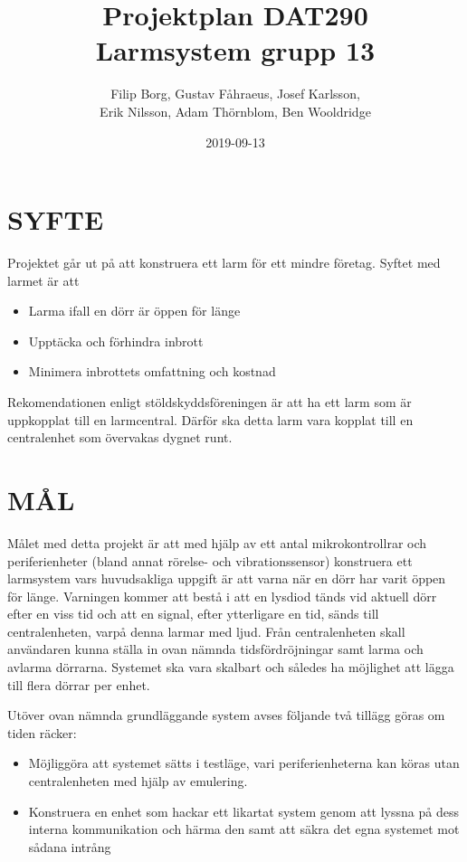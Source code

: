 \documentclass[a4paper]{article}
\title{Projektplan DAT290 \\ \Large Larmsystem grupp 13}
\author{Filip Borg, Gustav Fåhraeus, Josef Karlsson,\\
            Erik Nilsson, Adam Thörnblom, Ben Wooldridge}
\date{2019-09-13}
\begin{document}
\maketitle
{}
\newpage

\tableofcontents
\newpage



\section{SYFTE}
\label{sec:syfte}

Projektet går ut på att konstruera ett larm för ett mindre företag. Syftet med larmet är att
\begin{itemize}
    \item Larma ifall en dörr är öppen för länge
    \item Upptäcka och förhindra inbrott
    \item Minimera inbrottets omfattning och kostnad

\end{itemize}
Rekomendationen enligt stöldskyddsföreningen är att ha ett larm som är uppkopplat till en larmcentral. Därför ska detta larm vara kopplat till en centralenhet som övervakas dygnet runt.

\section{MÅL}
\label{sec:mål}

Målet med detta projekt är att med hjälp av ett antal mikrokontrollrar och periferienheter (bland annat rörelse- och vibrationssensor) konstruera ett larmsystem vars huvudsakliga uppgift är att varna när en dörr har varit öppen för länge. Varningen kommer att bestå i att en lysdiod tänds vid aktuell dörr efter en viss tid och att en signal, efter ytterligare en tid, sänds till centralenheten, varpå denna larmar med ljud. Från centralenheten skall användaren kunna ställa in ovan nämnda tidsfördröjningar samt larma och avlarma dörrarna. Systemet ska vara skalbart och således ha möjlighet att lägga till flera dörrar per enhet.

Utöver ovan nämnda grundläggande system avses följande två tillägg göras om tiden räcker:
\begin{itemize}
	\item Möjliggöra att systemet sätts i testläge, vari periferienheterna kan köras utan centralenheten med hjälp av emulering.
	\item Konstruera en enhet som hackar ett likartat system genom att lyssna på dess interna kommunikation och härma den samt att säkra det egna systemet mot sådana intrång
\end{itemize}
\end{document}
